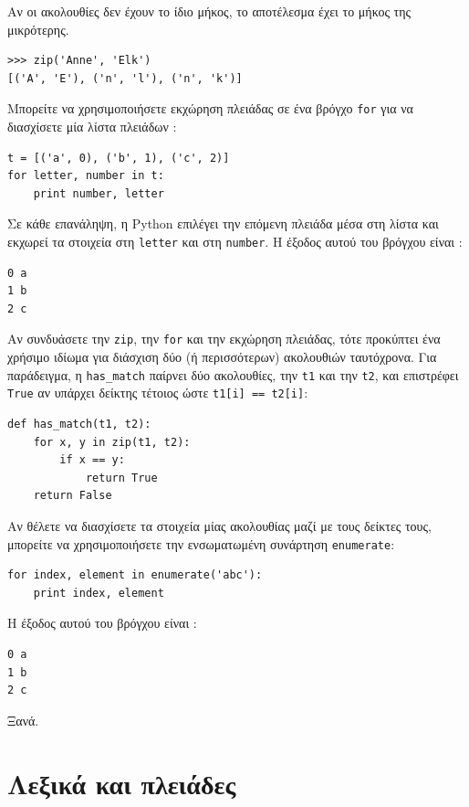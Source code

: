 \documentclass[10pt]{book}
\begin{document}
Αν οι ακολουθίες δεν έχουν το ίδιο μήκος, το αποτέλεσμα έχει το μήκος της μικρότερης.

\begin{verbatim}
>>> zip('Anne', 'Elk')
[('A', 'E'), ('n', 'l'), ('n', 'k')]
\end{verbatim}
%
 Μπορείτε να χρησιμοποιήσετε εκχώρηση πλειάδας σε ένα βρόγχο  {\tt for}  για να διασχίσετε μία λίστα πλειάδων :

\begin{verbatim}
t = [('a', 0), ('b', 1), ('c', 2)]
for letter, number in t:
    print number, letter
\end{verbatim}
%
 Σε κάθε επανάληψη, η  Python  επιλέγει την επόμενη πλειάδα μέσα στη λίστα και εκχωρεί τα στοιχεία στη  {\tt letter}  και στη  {\tt number}.  Η έξοδος αυτού του βρόγχου είναι :

\begin{verbatim}
0 a
1 b
2 c
\end{verbatim}
%
 Αν συνδυάσετε την  {\tt zip},  την  {\tt for}  και την εκχώρηση πλειάδας, τότε προκύπτει ένα χρήσιμο ιδίωμα  για διάσχιση δύο (ή περισσότερων) ακολουθιών ταυτόχρονα. Για παράδειγμα, η  \verb"has_match"  παίρνει δύο ακολουθίες, την  {\tt t1}  και την  {\tt t2},  και επιστρέφει  {\tt True}  αν υπάρχει δείκτης τέτοιος ώστε  {\tt t1[i] == t2[i]}:

\begin{verbatim}
def has_match(t1, t2):
    for x, y in zip(t1, t2):
        if x == y:
            return True
    return False
\end{verbatim}
%
 Αν θέλετε να διασχίσετε τα στοιχεία μίας ακολουθίας μαζί με τους δείκτες τους, μπορείτε να χρησιμοποιήσετε την ενσωματωμένη συνάρτηση  {\tt enumerate}:

\begin{verbatim}
for index, element in enumerate('abc'):
    print index, element
\end{verbatim}
%
 Η έξοδος αυτού του βρόγχου είναι :

\begin{verbatim}
0 a
1 b
2 c
\end{verbatim}
%
 Ξανά.


\section{Λεξικά και πλειάδες}
\label{dictuple}
\end{document}
